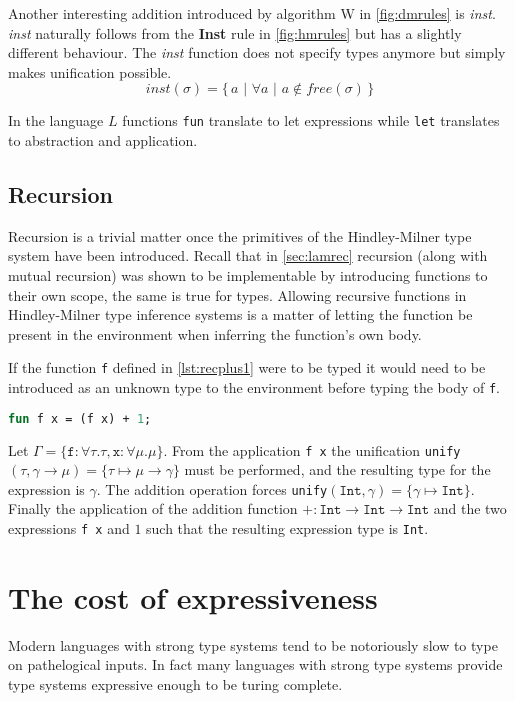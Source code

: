 \documentclass[11pt,oneside,a4paper]{report}
\begin{document}
Another interesting addition introduced by algorithm W in \autoref{fig:dmrules} is \textit{inst}.
\textit{inst} naturally follows from the \textbf{Inst} rule in \autoref{fig:hmrules} but has a slightly different behaviour.
The \textit{inst} function does not specify types anymore but simply makes unification possible.
\[
    \textit{inst}(\sigma) = \{ \, a \,\,|\,\, \forall a \,\,|\,\, a \notin \textit{free}(\sigma) \, \}
\]
\begin{remark}
In the language $L$ functions \texttt{fun} translate to let expressions while \texttt{let} translates to abstraction and application.
\end{remark}
\subsection{Recursion}
Recursion is a trivial matter once the primitives of the Hindley-Milner type system have been introduced.
Recall that in \autoref{sec:lamrec} recursion (along with mutual recursion) was shown to be implementable by introducing functions to their own scope, the same is true for types.
Allowing recursive functions in Hindley-Milner type inference systems is a matter of letting the function be present in the environment when inferring the function's own body.
\begin{exmp}
If the function \texttt{f} defined in \autoref{lst:recplus1} were to be typed it would need to be introduced as an unknown type to the environment before typing the body of \texttt{f}.
\begin{lstlisting}[language=ML,caption={Recursive function},label={lst:recplus1},mathescape=true]
fun f x = (f x) + 1;
\end{lstlisting}
Let $\Gamma = \{ \texttt{f} : \forall \tau . \tau, \texttt{x} : \forall \mu . \mu \}$.
From the application \texttt{f x} the unification \texttt{unify}$(\tau, \gamma \rightarrow \mu) = \{ \tau \mapsto \mu \rightarrow \gamma \}$ must be performed, and the resulting type for the expression is $\gamma$.
The addition operation forces \texttt{unify}$(\texttt{Int}, \gamma) = \{ \gamma \mapsto \texttt{Int} \}$.
Finally the application of the addition function $+: \texttt{Int} \rightarrow \texttt{Int} \rightarrow \texttt{Int}$ and the two expressions \texttt{f x} and $1$ such that the resulting expression type is \texttt{Int}.

\end{exmp}

\section{The cost of expressiveness}
Modern languages with strong type systems tend to be notoriously slow to type on pathelogical inputs.
In fact many languages with strong type systems provide type systems expressive enough to be turing complete.
\end{document}
